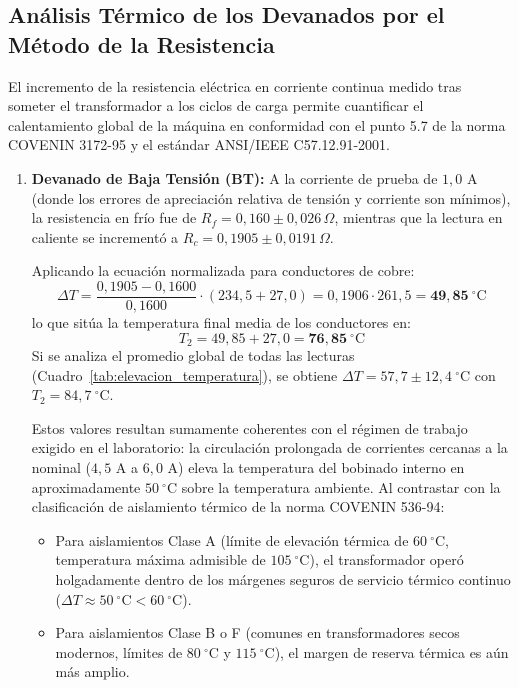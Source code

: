 \subsection{Análisis Térmico de los Devanados por el Método de la Resistencia}

El incremento de la resistencia eléctrica en corriente continua medido tras someter el transformador a los ciclos de carga permite cuantificar el calentamiento global de la máquina en conformidad con el punto 5.7 de la norma COVENIN 3172-95 y el estándar ANSI/IEEE C57.12.91-2001.

\begin{enumerate}
    \item \textbf{Devanado de Baja Tensión (BT):}
    A la corriente de prueba de $1{,}0\text{ A}$ (donde los errores de apreciación relativa de tensión y corriente son mínimos), la resistencia en frío fue de $R_f = 0{,}160 \pm 0{,}026\,\Omega$, mientras que la lectura en caliente se incrementó a $R_c = 0{,}1905 \pm 0{,}0191\,\Omega$.
    
    Aplicando la ecuación normalizada para conductores de cobre:
    \begin{equation}
        \Delta T = \frac{0{,}1905 - 0{,}1600}{0{,}1600} \cdot (234{,}5 + 27{,}0) = 0{,}1906 \cdot 261{,}5 = \mathbf{49{,}85~^{\circ}\mathrm{C}}
    \end{equation}
    lo que sitúa la temperatura final media de los conductores en:
    \begin{equation}
        T_2 = 49{,}85 + 27{,}0 = \mathbf{76{,}85~^{\circ}\mathrm{C}}
    \end{equation}
    Si se analiza el promedio global de todas las lecturas (Cuadro~\ref{tab:elevacion_temperatura}), se obtiene $\Delta T = 57{,}7 \pm 12{,}4~^{\circ}\mathrm{C}$ con $T_2 = 84{,}7~^{\circ}\mathrm{C}$. 
    
    Estos valores resultan sumamente coherentes con el régimen de trabajo exigido en el laboratorio: la circulación prolongada de corrientes cercanas a la nominal ($4{,}5\text{ A}$ a $6{,}0\text{ A}$) eleva la temperatura del bobinado interno en aproximadamente $50~^{\circ}\mathrm{C}$ sobre la temperatura ambiente. Al contrastar con la clasificación de aislamiento térmico de la norma COVENIN 536-94:
    \begin{itemize}
        \item Para aislamientos Clase A (límite de elevación térmica de $60~^{\circ}\mathrm{C}$, temperatura máxima admisible de $105~^{\circ}\mathrm{C}$), el transformador operó holgadamente dentro de los márgenes seguros de servicio térmico continuo ($\Delta T \approx 50~^{\circ}\mathrm{C} < 60~^{\circ}\mathrm{C}$).
        \item Para aislamientos Clase B o F (comunes en transformadores secos modernos, límites de $80~^{\circ}\mathrm{C}$ y $115~^{\circ}\mathrm{C}$), el margen de reserva térmica es aún más amplio.
    \end{itemize}


\end{enumerate}
